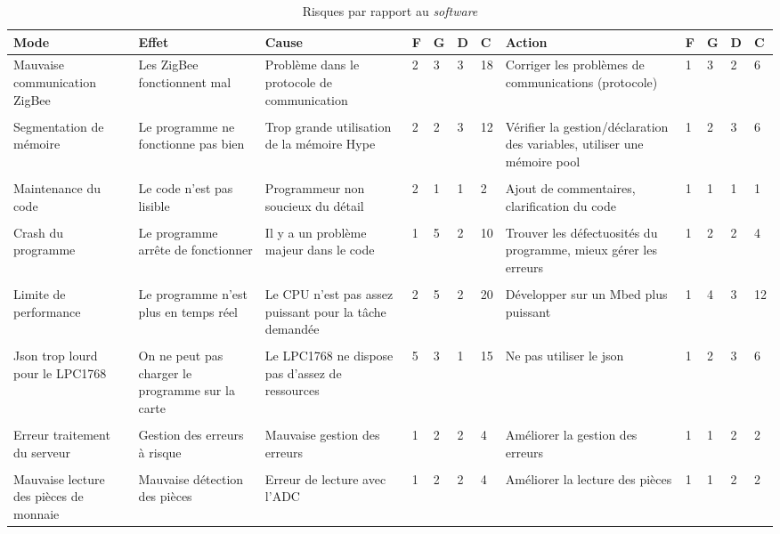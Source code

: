 \begin{table}[h]
	\centering
	\caption{Risques par rapport au \emph{software}}
	\begin{tabular}{P{2cm}P{2cm}P{2cm}llllP{2cm}llll}
		\hline
		\bf Mode & \bf Effet & \bf Cause & \bf F & \bf G & \bf D & \bf C & \bf Action & \bf F & \bf G & \bf D & \bf C  \\
		\hline
		\hline
		Mauvaise communication ZigBee & Les ZigBee fonctionnent mal & Problème dans le protocole de communication & 2 & 3 & 3 & 18 & Corriger les problèmes de communications (protocole) & 1 & 3 & 2 & 6 \\\\ 
		Segmentation de mémoire & Le programme ne fonctionne pas bien & Trop grande utilisation de la mémoire Hype & 2 & 2 & 3 & 12 & Vérifier la gestion/déclaration des variables, utiliser une mémoire pool & 1 & 2 & 3 & 6 \\\\
		Maintenance du code & Le code n'est pas lisible & Programmeur non soucieux du détail & 2& 1 & 1 & 2 & Ajout de commentaires, clarification du code & 1 & 1 & 1 & 1 \\\\
		Crash du programme & Le programme arrête de fonctionner & Il y a un problème majeur dans le code & 1 & 5 & 2 & 10 & Trouver les défectuosités du programme, mieux gérer les erreurs & 1 & 2 & 2 & 4 \\\\
		Limite de performance & Le programme n'est plus en temps réel & Le CPU n'est pas assez puissant pour la tâche demandée & 2 & 5 & 2 & 20 & Développer sur un Mbed plus puissant & 1 & 4 & 3 & 12 \\\\
		Json trop lourd pour le LPC1768 & On ne peut pas charger le programme sur la carte & Le LPC1768 ne dispose pas d'assez de ressources & 5 & 3 & 1 & 15 & Ne pas utiliser le json & 1 & 2 & 3 & 6 \\\\
		Erreur traitement du serveur & Gestion des erreurs à risque & Mauvaise gestion des erreurs & 1 & 2 & 2 & 4 & Améliorer la gestion des erreurs & 1 & 1 & 2 & 2 \\\\
		Mauvaise lecture des pièces de monnaie & Mauvaise détection des pièces & Erreur de lecture avec l'ADC & 1 & 2 & 2 & 4 & Améliorer la lecture des pièces & 1 & 1 & 2 & 2 \\
		\hline
	\end{tabular}
\end{table}
